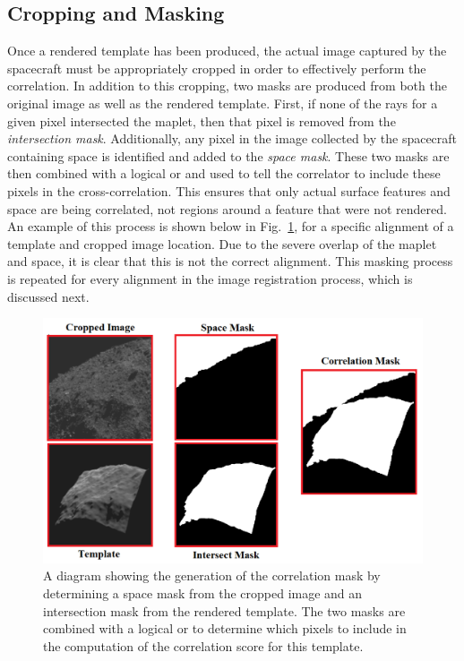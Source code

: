 \documentclass{RPI-SIW}
\begin{document}
\subsection*{Cropping and Masking}
Once a rendered template has been produced, the actual image captured by the spacecraft must be appropriately cropped in order to effectively perform the correlation.  In addition to this cropping, two masks are produced from both the original image as well as the rendered template.  First, if none of the rays for a given pixel intersected the maplet, then that pixel is removed from the \textit{intersection mask}.  Additionally, any pixel in the image collected by the spacecraft containing space is identified and added to the \textit{space mask}.  These two masks are then combined with a logical or and used to tell the correlator to include these pixels in the cross-correlation.  This ensures that only actual surface features and space are being correlated, not regions around a feature that were not rendered.  An example of this process is shown below in Fig.~\ref{figs::masks}, for a specific alignment of a template and cropped image location.  Due to the severe overlap of the maplet and space, it is clear that this is not the correct alignment.  This masking process is repeated for every alignment in the image registration process, which is discussed next.
\begin{figure}
	\centering
	\includegraphics[width=\columnwidth]{figs/masks.png}
	\caption{A diagram showing the generation of the correlation mask by determining a space mask from the cropped image and an intersection mask from the rendered template.  The two masks are combined with a logical or to determine which pixels to include in the computation of the correlation score for this template.}
	\label{figs::masks}
\end{figure}
\end{document}
